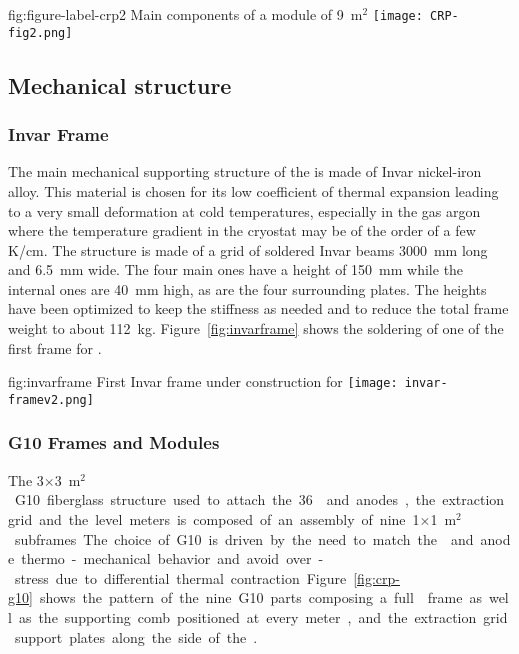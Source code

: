 \begin{dunefigure}{fig:figure-label-crp2}
{Main components of a  module of  \SI{9}{m$^{2}$}}
\texttt{[image: CRP-fig2.png]}
\end{dunefigure}

\subsection{Mechanical structure}
\label{sec:fddp-crp-mechanics}
\subsubsection{Invar Frame}

The main mechanical supporting structure of the  is made of Invar nickel-iron alloy. This material is chosen for its low coefficient of thermal expansion leading to a very small deformation at cold temperatures, especially in the gas argon where the temperature gradient in the cryostat may be of the order of a few \si{K/cm}.
The structure is made of a grid of soldered Invar beams \SI{3000}{mm} long and \SI{6.5}{mm} wide. The four main ones have a height of \SI{150}{mm} while the internal ones are \SI{40}{mm} high, as are the four surrounding plates. The heights have been optimized to keep the stiffness as needed and to reduce the total frame weight to  %
 about \SI{112}{kg}.
Figure~\ref{fig:invarframe} shows the soldering of one of the first  frame for .

\begin{dunefigure}{fig:invarframe}
{First  Invar frame under construction for }
\texttt{[image: invar-framev2.png]}
\end{dunefigure}

\subsubsection{G10 Frames and Modules}
\label{sec:invar-frame}

The \num{3}$\times$\SI{3}{m$^{2}$}  G10 fiberglass structure used to attach the \num{36}  and anodes, the extraction grid and the level meters is composed of an assembly of nine \num{1}$\times$\SI{1}{m$^{2}$} subframes. The choice of G10 is driven by the need to match the  and anode thermo-mechanical behavior and avoid over-stress due to differential thermal contraction. 
Figure~\ref{fig:crp-g10} shows the pattern of the nine G10 parts composing a full  frame as well as the supporting comb positioned at every meter, and the extraction grid support plates along the side of the .

